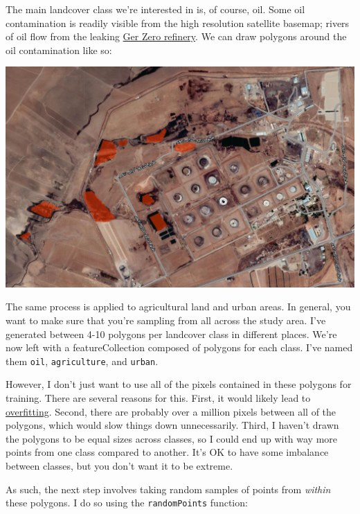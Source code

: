 \documentclass[
  letterpaper,
  DIV=11,
  numbers=noendperiod]{scrreprt}
\begin{document}
The main landcover class we're interested in is, of course, oil. Some
oil contamination is readily visible from the high resolution satellite
basemap; rivers of oil flow from the leaking
\href{https://zoom.earth/\#view=36.947921,42.02871,16z/overlays=heat,labels:off,crosshair}{Ger
Zero refinery}. We can draw polygons around the oil contamination like
so:

\includegraphics{./images/ger_zero.png}

The same process is applied to agricultural land and urban areas. In
general, you want to make sure that you're sampling from all across the
study area. I've generated between 4-10 polygons per landcover class in
different places. We're now left with a featureCollection composed of
polygons for each class. I've named them \texttt{oil},
\texttt{agriculture}, and \texttt{urban}.

However, I don't just want to use all of the pixels contained in these
polygons for training. There are several reasons for this. First, it
would likely lead to
\href{https://en.wikipedia.org/wiki/Overfitting}{overfitting}. Second,
there are probably over a million pixels between all of the polygons,
which would slow things down unnecessarily. Third, I haven't drawn the
polygons to be equal sizes across classes, so I could end up with way
more points from one class compared to another. It's OK to have some
imbalance between classes, but you don't want it to be extreme.

As such, the next step involves taking random samples of points from
\emph{within} these polygons. I do so using the \texttt{randomPoints}
function:
\end{document}

